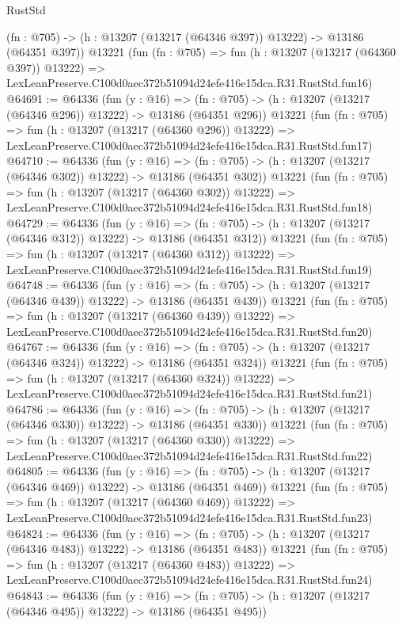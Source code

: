 \begin{lexlean}{RustStd}
\begin{coremodule}
    (fn : @705) -> (h : @13207 (@13217 (@64346 @397)) @13222) -> @13186 (@64351 @397))
    @13221
    (fun (fn : @705) =>
    fun (h : @13207 (@13217 (@64360 @397)) @13222) =>
    LexLeanPreserve.C100d0aec372b51094d24efe416e15dca.R31.RustStd.fun16)
@64691 := @64336
    (fun (y : @16) =>
    (fn : @705) -> (h : @13207 (@13217 (@64346 @296)) @13222) -> @13186 (@64351 @296))
    @13221
    (fun (fn : @705) =>
    fun (h : @13207 (@13217 (@64360 @296)) @13222) =>
    LexLeanPreserve.C100d0aec372b51094d24efe416e15dca.R31.RustStd.fun17)
@64710 := @64336
    (fun (y : @16) =>
    (fn : @705) -> (h : @13207 (@13217 (@64346 @302)) @13222) -> @13186 (@64351 @302))
    @13221
    (fun (fn : @705) =>
    fun (h : @13207 (@13217 (@64360 @302)) @13222) =>
    LexLeanPreserve.C100d0aec372b51094d24efe416e15dca.R31.RustStd.fun18)
@64729 := @64336
    (fun (y : @16) =>
    (fn : @705) -> (h : @13207 (@13217 (@64346 @312)) @13222) -> @13186 (@64351 @312))
    @13221
    (fun (fn : @705) =>
    fun (h : @13207 (@13217 (@64360 @312)) @13222) =>
    LexLeanPreserve.C100d0aec372b51094d24efe416e15dca.R31.RustStd.fun19)
@64748 := @64336
    (fun (y : @16) =>
    (fn : @705) -> (h : @13207 (@13217 (@64346 @439)) @13222) -> @13186 (@64351 @439))
    @13221
    (fun (fn : @705) =>
    fun (h : @13207 (@13217 (@64360 @439)) @13222) =>
    LexLeanPreserve.C100d0aec372b51094d24efe416e15dca.R31.RustStd.fun20)
@64767 := @64336
    (fun (y : @16) =>
    (fn : @705) -> (h : @13207 (@13217 (@64346 @324)) @13222) -> @13186 (@64351 @324))
    @13221
    (fun (fn : @705) =>
    fun (h : @13207 (@13217 (@64360 @324)) @13222) =>
    LexLeanPreserve.C100d0aec372b51094d24efe416e15dca.R31.RustStd.fun21)
@64786 := @64336
    (fun (y : @16) =>
    (fn : @705) -> (h : @13207 (@13217 (@64346 @330)) @13222) -> @13186 (@64351 @330))
    @13221
    (fun (fn : @705) =>
    fun (h : @13207 (@13217 (@64360 @330)) @13222) =>
    LexLeanPreserve.C100d0aec372b51094d24efe416e15dca.R31.RustStd.fun22)
@64805 := @64336
    (fun (y : @16) =>
    (fn : @705) -> (h : @13207 (@13217 (@64346 @469)) @13222) -> @13186 (@64351 @469))
    @13221
    (fun (fn : @705) =>
    fun (h : @13207 (@13217 (@64360 @469)) @13222) =>
    LexLeanPreserve.C100d0aec372b51094d24efe416e15dca.R31.RustStd.fun23)
@64824 := @64336
    (fun (y : @16) =>
    (fn : @705) -> (h : @13207 (@13217 (@64346 @483)) @13222) -> @13186 (@64351 @483))
    @13221
    (fun (fn : @705) =>
    fun (h : @13207 (@13217 (@64360 @483)) @13222) =>
    LexLeanPreserve.C100d0aec372b51094d24efe416e15dca.R31.RustStd.fun24)
@64843 := @64336
    (fun (y : @16) =>
    (fn : @705) -> (h : @13207 (@13217 (@64346 @495)) @13222) -> @13186 (@64351 @495))

\end{coremodule}
\end{lexlean}

